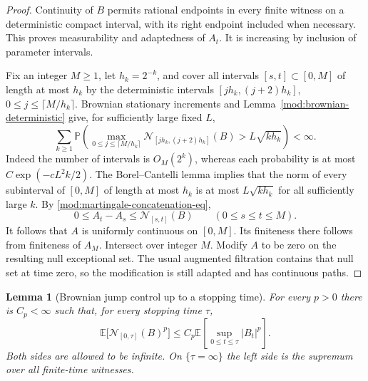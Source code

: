 \documentclass[11pt]{article}
\numberwithin{equation}{section}
\newtheorem{lemma}[theorem]{Lemma}
\theoremstyle{remark}
\theoremstyle{definition}
\begin{document}
\begin{proof}
Continuity of $B$ permits rational endpoints in every finite witness
on a deterministic compact interval, with its right endpoint included
when necessary. This proves measurability and adaptedness of $A_t$.
It is increasing by inclusion of parameter intervals.

Fix an integer $M\ge1$, let $h_k=2^{-k}$, and cover all intervals
$[s,t]\subset[0,M]$ of length at most $h_k$ by the deterministic
intervals $[jh_k,(j+2)h_k]$, $0\le j\le\lceil M/h_k\rceil$.
Brownian stationary increments and Lemma~\ref{mod:brownian-deterministic}
give, for sufficiently large fixed $L$,
\[
 \sum_{k\ge1}\mathbb P\!\left(
  \max_{0\le j\le\lceil M/h_k\rceil}
  \mathcal N_{[jh_k,(j+2)h_k]}(B)
      >L\sqrt{k h_k}\right)<\infty.
\]
Indeed the number of intervals is $O_M(2^k)$, whereas each probability
is at most $C\exp(-cL^2k/2)$. The Borel--Cantelli lemma implies that
the norm of every subinterval of $[0,M]$ of length at most $h_k$
is at most $L\sqrt{k h_k}$ for all sufficiently large $k$.
By \eqref{mod:martingale-concatenation-eq},
\[
 0\le A_t-A_s\le\mathcal N_{[s,t]}(B)\qquad(0\le s\le t\le M).
\]
It follows that $A$ is uniformly continuous on $[0,M]$. Its finiteness
there follows from finiteness of $A_M$. Intersect over integer $M$.
Modify $A$ to be zero on the resulting null exceptional set. The
usual augmented filtration contains that null set at time zero, so
the modification is still adapted and has continuous paths.
\end{proof}

\begin{lemma}[Brownian jump control up to a stopping time]
\label{mod:brownian-stopped}
For every $p>0$ there is $C_p<\infty$ such that, for every stopping
time $\tau$,
\begin{equation}\label{mod:brownian-stopped-bound}
 \mathbb E\bigl[\mathcal N_{[0,\tau]}(B)^p\bigr]
 \le C_p\mathbb E\left[\sup_{0\le t\le\tau}|B_t|^p\right].
\end{equation}
Both sides are allowed to be infinite. On $\{\tau=\infty\}$ the
left side is the supremum over all finite-time witnesses.
\end{lemma}
\end{document}
